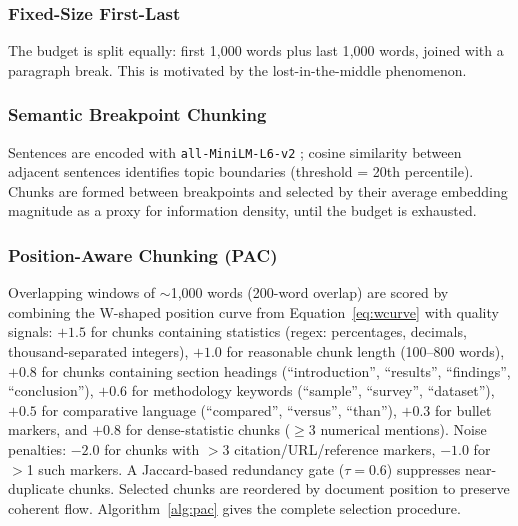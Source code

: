 \documentclass[journal]{IEEEtran}
\begin{document}
\subsubsection{Fixed-Size First-Last}
The budget is split equally: first 1{,}000 words plus last 1{,}000 words, joined with a paragraph break. This is motivated by the lost-in-the-middle phenomenon.

\subsubsection{Semantic Breakpoint Chunking}
Sentences are encoded with \texttt{all-MiniLM-L6-v2} \cite{reimers2019sentence}; cosine similarity between adjacent sentences identifies topic boundaries (threshold = 20th percentile). Chunks are formed between breakpoints and selected by their average embedding magnitude as a proxy for information density, until the budget is exhausted.

\subsubsection{Position-Aware Chunking (PAC)}
Overlapping windows of $\sim$1{,}000 words (200-word overlap) are scored by combining the W-shaped position curve from Equation~\ref{eq:wcurve} with quality signals: $+1.5$ for chunks containing statistics (regex: percentages, decimals, thousand-separated integers), $+1.0$ for reasonable chunk length (100--800 words), $+0.8$ for chunks containing section headings (``introduction'', ``results'', ``findings'', ``conclusion''), $+0.6$ for methodology keywords (``sample'', ``survey'', ``dataset''), $+0.5$ for comparative language (``compared'', ``versus'', ``than''), $+0.3$ for bullet markers, and $+0.8$ for dense-statistic chunks ($\geq$3 numerical mentions). Noise penalties: $-2.0$ for chunks with $>$3 citation/URL/reference markers, $-1.0$ for $>$1 such markers. A Jaccard-based redundancy gate ($\tau = 0.6$) suppresses near-duplicate chunks. Selected chunks are reordered by document position to preserve coherent flow. Algorithm~\ref{alg:pac} gives the complete selection procedure.
\end{document}

